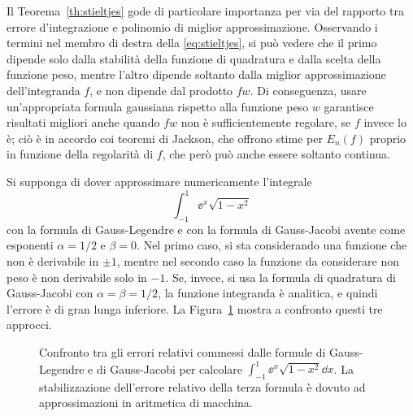 	Il Teorema~\ref{th:stieltjes} gode di particolare importanza per via del rapporto tra errore d'integrazione e polinomio di miglior approssimazione. Osservando i termini nel membro di destra della \eqref{eq:stieltjes}, si può vedere che il primo dipende solo dalla stabilità della funzione di quadratura e dalla scelta della funzione peso, mentre l'altro dipende soltanto dalla miglior approssimazione dell'integranda \(f\), e non dipende dal prodotto \(f w\). Di conseguenza, usare un'appropriata formula gaussiana rispetto alla funzione peso \(w\) garantisce risultati migliori anche quando \(f w\) non è sufficientemente regolare, se \(f\) invece lo è; ciò è in accordo coi teoremi di Jackson, che offrono stime per \(E_n (f)\) proprio in funzione della regolarità di \(f\), che però può anche essere soltanto continua.
	
	\begin{esempio}
		Si supponga di dover approssimare numericamente l'integrale
		\begin{equation*}
			\int_{-1}^1 \ee^x \sqrt{1 - x^2}
		\end{equation*}
		con la formula di Gauss-Legendre e con la formula di Gauss-Jacobi avente come esponenti \(\alpha = 1 / 2\) e \(\beta = 0\). Nel primo caso, si sta considerando una funzione che non è derivabile in \(\pm 1\), mentre nel secondo caso la funzione da considerare non peso è non derivabile solo in \(-1\). Se, invece, si usa la formula di quadratura di Gauss-Jacobi con \(\alpha = \beta = 1/2\), la funzione integranda è analitica, e quindi l'errore è di gran lunga inferiore. La Figura~\ref{fig:legendre-jacobi} mostra a confronto questi tre approcci.
		
		\begin{figure}[tpb]
			\centering
			
			
			\caption{Confronto tra gli errori relativi commessi dalle formule di Gauss-Legendre e di Gauss-Jacobi per calcolare \(\int_{-1}^1 \ee^x \sqrt{1 - x^2} \dd{x}\). La stabilizzazione dell'errore relativo della terza formula è dovuto ad approssimazioni in aritmetica di macchina.}\label{fig:legendre-jacobi}
		\end{figure}
	\end{esempio}

